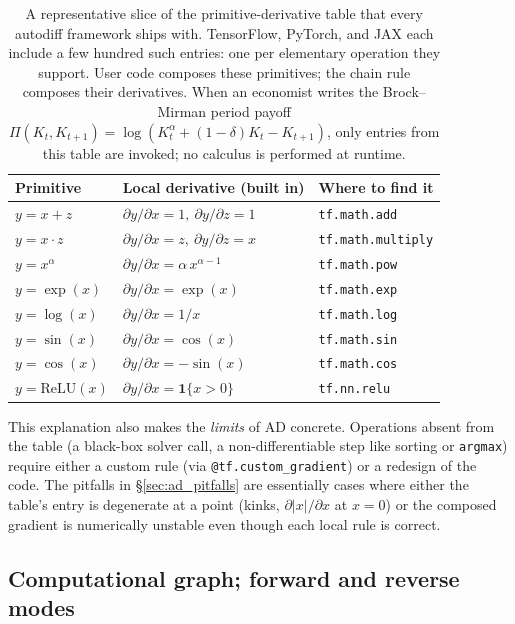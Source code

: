 \documentclass[11pt,a4paper]{report}
\begin{document}
\begin{table}[ht]
\centering
\small
\renewcommand{\arraystretch}{1.15}
\begin{tabular}{l l l}
\toprule
\textbf{Primitive} & \textbf{Local derivative (built in)} & \textbf{Where to find it} \\
\midrule
$y = x + z$ & $\partial y/\partial x = 1,\ \partial y/\partial z = 1$ & \texttt{tf.math.add} \\
$y = x \cdot z$ & $\partial y/\partial x = z,\ \partial y/\partial z = x$ & \texttt{tf.math.multiply} \\
$y = x^{\alpha}$ & $\partial y/\partial x = \alpha\,x^{\alpha-1}$ & \texttt{tf.math.pow} \\
$y = \exp(x)$ & $\partial y/\partial x = \exp(x)$ & \texttt{tf.math.exp} \\
$y = \log(x)$ & $\partial y/\partial x = 1/x$ & \texttt{tf.math.log} \\
$y = \sin(x)$ & $\partial y/\partial x = \cos(x)$ & \texttt{tf.math.sin} \\
$y = \cos(x)$ & $\partial y/\partial x = -\sin(x)$ & \texttt{tf.math.cos} \\
$y = \mathrm{ReLU}(x)$ & $\partial y/\partial x = \mathbf{1}\{x > 0\}$ & \texttt{tf.nn.relu} \\
\bottomrule
\end{tabular}
\caption{A representative slice of the primitive-derivative table that every autodiff framework ships with.  TensorFlow, PyTorch, and JAX each include a few hundred such entries: one per elementary operation they support.  User code composes these primitives; the chain rule composes their derivatives.  When an economist writes the Brock--Mirman period payoff $\Pi(K_t, K_{t+1}) = \log(K_t^{\alpha} + (1-\delta)K_t - K_{t+1})$, only entries from this table are invoked; no calculus is performed at runtime.}
\label{tab:ad_primitives}
\end{table}

This explanation also makes the \emph{limits} of AD concrete.  Operations absent from the table (a black-box solver call, a non-differentiable step like sorting or \texttt{argmax}) require either a custom rule (via \texttt{@tf.custom\_gradient}) or a redesign of the code.  The pitfalls in \S\ref{sec:ad_pitfalls} are essentially cases where either the table's entry is degenerate at a point (kinks, $\partial|x|/\partial x$ at $x=0$) or the composed gradient is numerically unstable even though each local rule is correct.

\subsection{Computational graph; forward and reverse modes}
\label{sec:ad_modes}
\end{document}
